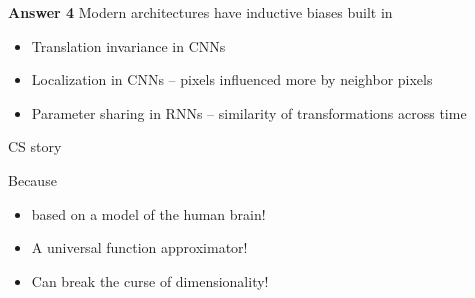 \documentclass[xcolor=dvipsnames, 10pt]{beamer}
\begin{document}
\begin{frame}
    
    \textbf{Answer 4} Modern architectures have inductive biases built in

            \vspace{0.5em}
            \vspace{0.5em}

    \Egs

    \begin{itemize}
        \item Translation invariance in CNNs 
            \vspace{0.5em}
        \item Localization in CNNs -- pixels influenced more by neighbor pixels 
            \vspace{0.5em}
        \item Parameter sharing in RNNs -- similarity of transformations across
            time
    \end{itemize}

            \vspace{0.5em}

    
\end{frame}





\begin{frame}{CS story}

    Because 

    \begin{itemize}
        \item based on a model of the human brain! 
        \vspace{0.5em}
        \item A universal function approximator!
        \vspace{0.5em}
        \item Can break the curse of dimensionality!
    \end{itemize}

    \medskip
    \medskip
    \medskip
    \pause

    \begin{center}
    \end{center}

\end{frame}
\end{document}
